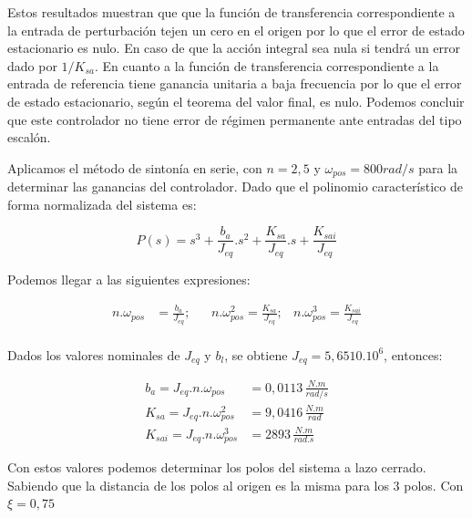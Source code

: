 \documentclass{article}
\begin{document}
Estos resultados muestran que que la función de transferencia
correspondiente a la entrada de perturbación tejen un cero en el origen por lo que el error de estado 
estacionario es nulo. En caso de que la acción integral sea nula si tendrá un error dado por $1/K_{sa}$.
En cuanto a la función de transferencia correspondiente a la entrada de referencia tiene ganancia
unitaria a baja frecuencia por lo que el error de estado estacionario, según el teorema del valor final, 
es nulo. Podemos concluir que este  controlador no tiene error de régimen permanente ante entradas del tipo escalón.

Aplicamos el método de sintonía en serie, con $n = 2,5$ y $\omega_{pos} = 800 rad/s$
para la determinar las ganancias del controlador. Dado que el polinomio 
característico de forma normalizada del sistema es:

\begin{equation}
    P(s) = s^3 + \frac{b_a}{J_{eq}}.s^2 + \frac{K_{sa}}{J_{eq}}.s + \frac{K_{sai}}{J_{eq}}
\end{equation}

Podemos llegar a las siguientes expresiones:

\begin{align*}
    n.\omega_{pos} &= \frac{b_a}{J_{eq}}; & &n.\omega_{pos}^2 = \frac{K_{sa}}{J_{eq}}; & n.\omega_{pos}^3 = \frac{K_{sai}}{J_{eq}} \\
\end{align*}

Dados los valores nominales de $J_{eq}$ y $b_l$, se obtiene $J_{eq} = 5,6510.10^6$, entonces:

\begin{align*}
    b_a = J_{eq}.n.\omega_{pos} &= 0,0113\, \frac{N.m}{rad/s} \\ 
    K_{sa} = J_{eq}.n.\omega_{pos}^2 &= 9,0416\, \frac{N.m}{rad} \\
    K_{sai} = J_{eq}.n.\omega_{pos}^3 &= 2893\, \frac{N.m}{rad.s}
\end{align*}

Con estos valores podemos determinar los polos del sistema a lazo cerrado. Sabiendo que la distancia
de los polos al origen es la misma para los 3 polos. Con $\xi = 0,75$
\end{document}
